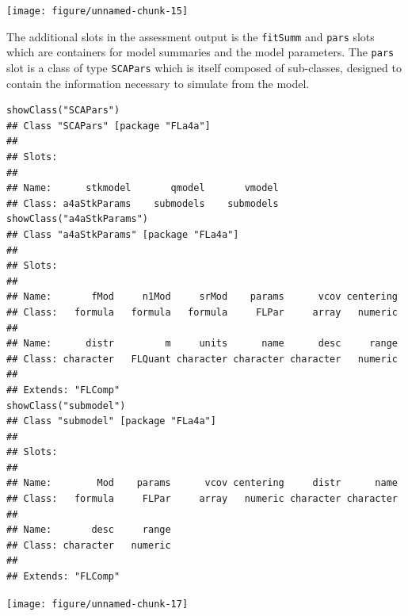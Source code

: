 \documentclass[a4paper,english,10pt]{article}\usepackage[]{graphicx}\usepackage[]{color}
\makeatletter
\newenvironment{kframe}{%
 \def\at@end@of@kframe{}%
 \ifinner\ifhmode%
  \def\at@end@of@kframe{\end{minipage}}%
  \begin{minipage}{\columnwidth}%
 \fi\fi%
 \def\FrameCommand##1{\hskip\@totalleftmargin \hskip-\fboxsep
 \colorbox{shadecolor}{##1}\hskip-\fboxsep
     \hskip-\linewidth \hskip-\@totalleftmargin \hskip\columnwidth}%
 \MakeFramed {\advance\hsize-\width
   \@totalleftmargin\z@ \linewidth\hsize
   \@setminipage}}%
 {\par\unskip\endMakeFramed%
 \at@end@of@kframe}
\newenvironment{knitrout}{}{} %
\makeatother
\begin{document}
\begin{knitrout}
\color{fgcolor}

{\centering \texttt{[image: figure/unnamed-chunk-15]} 

}



\end{knitrout}


The additional slots in the assessment output is the \texttt{fitSumm} and \texttt{pars} slots which are containers for model summaries and the model parameters.  The \texttt{pars} slot is a class of type \texttt{SCAPars} which is itself composed of sub-classes, designed to contain the information necessary to simulate from the model.

\begin{knitrout}
\color{fgcolor}\begin{kframe}
\begin{verbatim}
showClass("SCAPars")
## Class "SCAPars" [package "FLa4a"]
## 
## Slots:
##                                              
## Name:      stkmodel       qmodel       vmodel
## Class: a4aStkParams    submodels    submodels
showClass("a4aStkParams")
## Class "a4aStkParams" [package "FLa4a"]
## 
## Slots:
##                                                                   
## Name:       fMod     n1Mod     srMod    params      vcov centering
## Class:   formula   formula   formula     FLPar     array   numeric
##                                                                   
## Name:      distr         m     units      name      desc     range
## Class: character   FLQuant character character character   numeric
## 
## Extends: "FLComp"
showClass("submodel")
## Class "submodel" [package "FLa4a"]
## 
## Slots:
##                                                                   
## Name:        Mod    params      vcov centering     distr      name
## Class:   formula     FLPar     array   numeric character character
##                           
## Name:       desc     range
## Class: character   numeric
## 
## Extends: "FLComp"
\end{verbatim}
\end{kframe}
\end{knitrout}


\begin{knitrout}
\color{fgcolor}

{\centering \texttt{[image: figure/unnamed-chunk-17]} 

}



\end{knitrout}
\end{document}
